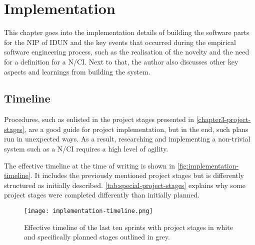 \chapter{Implementation}
\graphicspath{{Chapter4/Figs/}{Chapter4/Figs/}}

This chapter goes into the implementation details of building the software parts for the NIP of IDUN and the key events that occurred during the empirical software engineering process, such as the realisation of the novelty and the need for a definition for a N/CI. Next to that, the author also discusses other key aspects and learnings from building the system.

\section{Timeline}
\label{chapter4-timeline}

Procedures, such as enlisted in the project stages presented in \autoref{chapter3-project-stages}, are a good guide for project implementation, but in the end, such plans run in unexpected ways. As a result, researching and implementing a non-trivial system such as a N/CI requires a high level of agility.

The effective timeline at the time of writing is shown in \autoref{fig:implementation-timeline}. It includes the previously mentioned project stages but is differently structured as initially described. \autoref{tab:special-project-stages} explains why some project stages were completed differently than initially planned.

\begin{figure}[!ht]
  \centering
  \texttt{[image: implementation-timeline.png]}
  \caption{Effective timeline of the last ten sprints with project stages in white and specifically planned stages outlined in grey.}
  \label{fig:implementation-timeline}
\end{figure}

